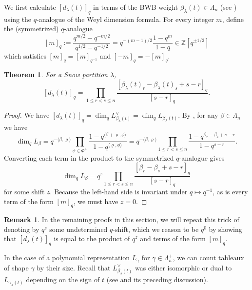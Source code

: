 \documentclass{amsart}
\newcommand\Z{\mathbb{Z}}
\theoremstyle{plain}
\newtheorem{theorem}{Theorem}[section]
\theoremstyle{definition}
\newtheorem{remark}[remark]{Remark}
\numberwithin{equation}{section}
\begin{document}
We first calculate $[d_\lambda(t)]_q$ in terms of the BWB weight $\beta_\lambda(t)\in\Lambda_n$ (see ) using the $q$-analogue of the Weyl dimension formula. For every integer $m$, define the (symmetrized) $q$-analogue
\[[m]_q:=\frac{q^{m/2}-q^{-m/2}}{q^{1/2}-q^{-1/2}}=q^{-(m-1)/2}\frac{1-q^m}{1-q}\in\Z[q^{\pm 1/2}]\]
which satisfies $[m]_q=[m]_{q^{-1}}$ and $[-m]_q=-[m]_q$.

\begin{theorem}\label{lem:q-weyl}
For a Snow partition $\lambda$,
\[[d_\lambda(t)]_q=\prod_{1\leq r<s\leq n}\frac{[\beta_\lambda(t)_r-\beta_\lambda(t)_s+s-r]_q}{[s-r]_q}.\]
\end{theorem}
\begin{proof}
We have $[d_\lambda(t)]_q=\dim_q L_{\beta_\lambda(t)}^\vee=\dim_q L_{\beta_\lambda(t)}$. By \cite[2.7]{Stem94}, for any $\beta\in\Lambda_n$ we have
\[\dim_q L_\beta=q^{-\langle \beta,\varrho\rangle}\prod_{\phi\in\Phi^+}\frac{1-q^{\langle \beta+\varrho,\phi\rangle}}{1-q^{\langle\varrho,\phi\rangle}}=q^{-\langle \beta,\varrho\rangle}\prod_{1\leq r<s\leq n}\frac{1-q^{\beta_r-\beta_s+s-r}}{1-q^{s-r}}.\]
Converting each term in the product to the symmetrized $q$-analogue gives
\[\dim_q L_\beta=q^z\prod_{1\leq r<s\leq n}\frac{[\beta_r-\beta_s+s-r]_q}{[s-r]_q}\]
for some shift $z$. Because the left-hand side is invariant under $q\mapsto q^{-1}$, as is every term of the form $[m]_q$, we must have $z=0$.
\end{proof}
\begin{remark}
In the remaining proofs in this section, we will repeat this trick of denoting by $q^z$ some undetermined $q$-shift, which we reason to be $q^0$ by showing that $[d_\lambda(t)]_q$ is equal to the product of $q^z$ and terms of the form $[m]_q$.
\end{remark}

In the case of a polynomial representation $L_\gamma$ for $\gamma\in\Lambda_n^+$, we can count tableaux of shape $\gamma$ by their size. Recall that $L_{\beta_\lambda(t)}^\vee$ was either isomorphic or dual to $L_{\gamma_\lambda(t)}$ depending on the sign of $t$ (see  and its preceding discussion).
\end{document}
